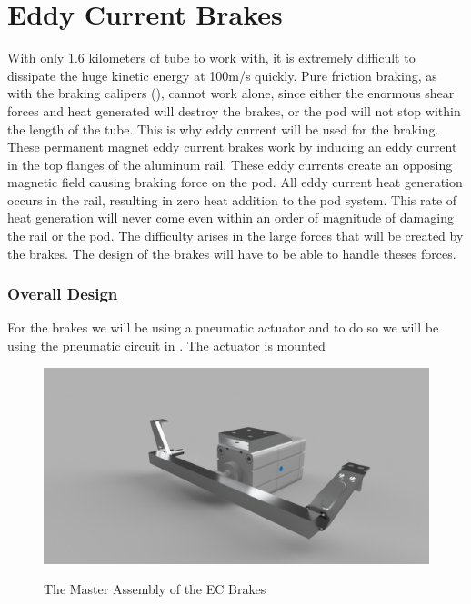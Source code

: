 \documentclass[main.tex]{subfiles}
\begin{document}
    \chapter{Eddy Current Brakes}
    \label{ch:eddy-current-brakes}
    With only 1.6 kilometers of tube to work with, it is extremely difficult to dissipate the huge kinetic energy at 100m/s quickly. Pure friction braking, as with the braking calipers (), cannot work alone, since either the enormous shear forces and heat generated will destroy the brakes, or the pod will not stop within the length of the tube. This is why eddy current will be used for the braking. These permanent magnet eddy current brakes work by inducing an eddy current in the top flanges of the aluminum rail. These eddy currents create an opposing magnetic field causing braking force on the pod. All eddy current heat generation occurs in the rail, resulting in zero heat addition to the pod system. This rate of heat generation will never come even within an order of magnitude of damaging the rail or the pod. The difficulty arises in the large forces that will be created by the brakes. The design of the brakes will have to be able to handle theses forces. 

    \subsection{Overall Design}
    For the brakes we will be using a pneumatic actuator and to do so we will be using the pneumatic circuit in . The actuator is mounted \\
    \begin{figure}
    	\centering
        \includegraphics[width =\linewidth]{images/EC_Brake_Master_2018}
        \label{fig:EC-Assembly}
        \caption{The Master Assembly of the EC Brakes}
    \end{figure}
    
\end{document}
